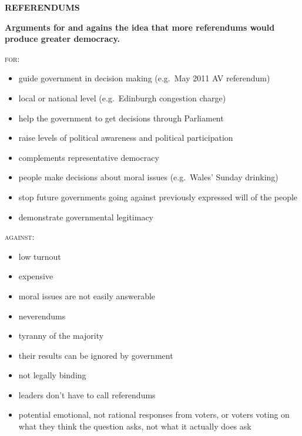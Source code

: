 \documentclass[12pt]{article}
\begin{document}
	
	\textbf{REFERENDUMS}
	
	\textbf{Arguments for and agains the idea that more referendums would produce greater democracy.}
	
	\textsc{for}:
	\begin{itemize}
		\item{guide government in decision making (e.g.\ May 2011 AV referendum)}
		\item{local or national level (e.g.\ Edinburgh congestion charge)}
		\item{help the government to get decisions through Parliament}
		\item{raise levels of political awareness and political participation}
		\item{complements representative democracy}
		\item{people make decisions about moral issues (e.g.\ Wales' Sunday drinking)}
		\item{stop future governments going against previously expressed will of the people}
		\item{demonstrate governmental legitimacy}
	\end{itemize}
	\textsc{against}:
	\begin{itemize}
		\item{low turnout}
		\item{expensive}
		\item{moral issues are not easily answerable}
		\item{neverendums}
		\item{tyranny of the majority}
		\item{their results can be ignored by government}
		\item{not legally binding}
		\item{leaders don't have to call referendums}
		\item{potential emotional, not rational responses from voters, or voters voting on what they think the question asks, not what it actually does ask}
	\end{itemize}
\end{document}

